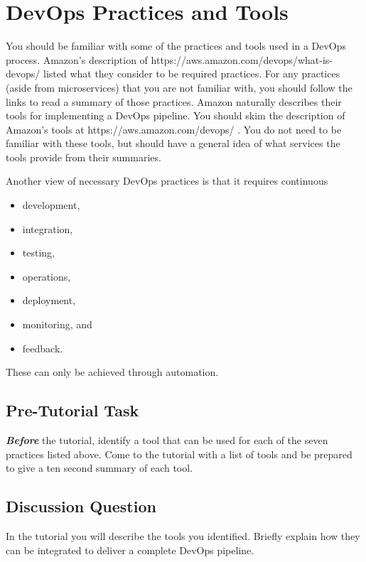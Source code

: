 \documentclass{csse4400}
\begin{document}
\section{DevOps Practices and Tools}\label{sec:DevOps-Practices}
You should be familiar with some of the practices and tools used in a DevOps process.
Amazon's description of 
{https://aws.amazon.com/devops/what-is-devops/} \cite{AWS-DevOps} listed what they consider to be required practices.
For any practices (aside from microservices) that you are not familiar with, you should follow the links to read a summary of those practices.
Amazon naturally describes their tools for implementing a DevOps pipeline.
You should skim the description of Amazon's tools at 
{https://aws.amazon.com/devops/} \cite{AWS-DevOps-Tools}.
You do not need to be familiar with these tools, but should have a general idea of what services the tools provide from their summaries.

\newpage
\noindent
Another view of necessary DevOps practices is that it requires continuous
\begin{itemize}[nosep]
    \item development,
    \item integration,
    \item testing,
    \item operations,
    \item deployment,
    \item monitoring, and
    \item feedback.
\end{itemize}
These can only be achieved through automation.

\subsection{Pre-Tutorial Task}
\textit{\textbf{Before}} the tutorial, identify a tool that can be used for each of the seven practices listed above.
Come to the tutorial with a list of tools and be prepared to give a ten second summary of each tool.

\subsection{Discussion Question}
In the tutorial you will describe the tools you identified. Briefly explain how they can be integrated to deliver a complete DevOps pipeline.

\end{document}
